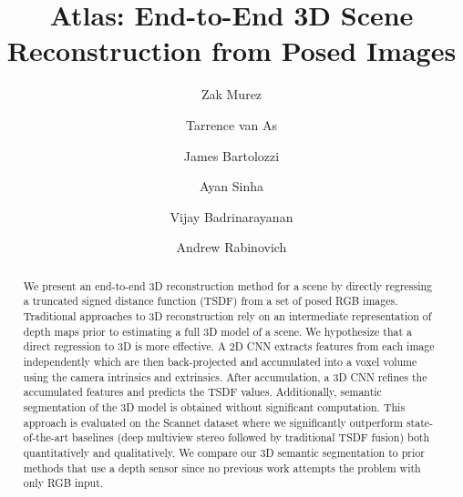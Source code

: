 \documentclass[runningheads]{llncs}
\begin{document}
\pagestyle{headings}
\mainmatter
\def\ECCVSubNumber{277}  

\title{Atlas: End-to-End 3D Scene Reconstruction from Posed Images} 

\begin{comment}
\titlerunning{ECCV-20 submission ID \ECCVSubNumber} 
\authorrunning{ECCV-20 submission ID \ECCVSubNumber} 
\author{Anonymous ECCV submission}
\institute{Paper ID \ECCVSubNumber}
\end{comment}




\author{Zak Murez \and
Tarrence van As \and
James Bartolozzi \inst{*} \and 
Ayan Sinha \and
Vijay Badrinarayanan  \and
Andrew Rabinovich }


\maketitle

\begin{abstract}
We present an end-to-end 3D reconstruction method for a scene by directly regressing a truncated signed distance function (TSDF) from a set of posed RGB images. Traditional approaches to 3D reconstruction rely on an intermediate representation of depth maps prior to estimating a full 3D model of a scene. We hypothesize that a direct regression to 3D is more effective. A 2D CNN extracts features from each image independently which are then back-projected and accumulated into a voxel volume using the camera intrinsics and extrinsics. After accumulation, a 3D CNN refines the accumulated features and predicts the TSDF values. Additionally, semantic segmentation of the 3D model is obtained without significant computation. This approach is evaluated on the Scannet dataset where we significantly outperform state-of-the-art baselines (deep multiview stereo followed by traditional TSDF fusion) both quantitatively and qualitatively. We compare our 3D semantic segmentation to prior methods that use a depth sensor since no previous work attempts the problem with only RGB input.

\end{abstract}
\end{document}
